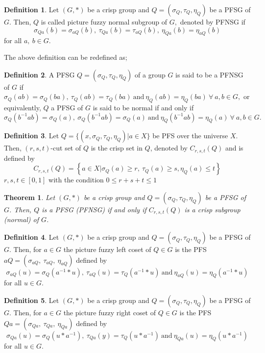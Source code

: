 \documentclass[12pt,letterpaper]{amsart}
\theoremstyle{plain}
\newtheorem{theorem}{Theorem}[section]
\theoremstyle{definition}
\newtheorem{definition}{Definition}[section]
\numberwithin{equation}{section}
\begin{document}
\begin{definition}\cite{dp}
Let $(G, \ast)$ be a crisp group and $Q = (\sigma_{Q}, \tau_Q, \eta_Q)$ be a PFSG of $G$. Then, $Q$ is called picture fuzzy normal subgroup of $G,$ denoted by PFNSG if $$\sigma_{Qa}(b) = \sigma_{aQ}(b),~ \tau_{Qa}(b) = \tau_{aQ}(b),~ \eta_{Qa}(b) = \eta_{aQ}(b)$$ for all $a,~ b \in G$.
\end{definition}
\noindent The above definition can be redefined as;
\begin{definition}
A PFSG $Q = (\sigma_{Q}, \tau_Q, \eta_Q)$ of a group $G$ is said to be a PFNSG of $G$ if $\sigma_Q(ab) = \sigma_Q(ba),~ \tau_Q(ab) = \tau_Q(ba)~ \text{and}~ \eta_Q(ab) = \eta_Q(ba)~\forall~ a, b \in G,$ or equivalently, $Q$ a PFSG of $G$ is said to be normal if and only if $$\sigma_Q(b^{-1}ab) = \sigma_Q(a),~ \sigma_Q(b^{-1}ab) = \sigma_Q(a)~ \text{and}~ \eta_Q(b^{-1}ab) = \eta_Q(a)~ \forall~ a, b \in G.$$
\end{definition}

\begin{definition} \cite{dp}
Let $Q  = \lbrace (x, \sigma_{Q}, \tau_{Q}, \eta_{Q})| a \in X \rbrace$ be PFS over the universe $X$. Then, $(r,s,t)$-cut set of $Q$ is the crisp set in $Q$, denoted by $C_{r, s, t} (Q)$ and is defined by $$C_{r, s, t} (Q) = \left\lbrace a \in X | \sigma_{Q}(a) \geq r,~\tau_{Q}(a) \geq s, \eta_{Q}(a) \leq t  \right\rbrace$$ $r, s, t \in [0, 1]$ with the condition  $0 \leq r + s + t \leq 1$
\end{definition}

\begin{theorem}\cite{dp}\label{1}
Let $(G, \ast)$ be a crisp group and $Q = (\sigma_{Q}, \tau_Q, \eta_Q)$ be a PFSG of $G$. Then, $Q$ is a PFSG (PFNSG) if and only if $C_{r, s, t} (Q)$ is a crisp subgroup (normal) of $G$.
\end{theorem}

\begin{definition} \cite{dp}
Let $(G, \ast)$ be a crisp group and $Q = (\sigma_{Q}, \tau_Q, \eta_Q)$ be a PFSG of $G$. Then, for $a \in G$ the picture fuzzy left coset of $Q \in G$ is the PFS $aQ = (\sigma_{aQ},~ \tau_{aQ},~ \eta_{aQ})$ defined by $$\sigma_{aQ}(u) = \sigma_{Q} (a^{-1} \ast u),~ \tau_{aQ}(u) = \tau_{Q} (a^{-1} \ast u)~ \text{and}~  \eta_{aQ}(u) = \eta_{Q} (a^{-1} \ast u)$$ for all $ u \in G$.
\end{definition}

\begin{definition}\cite{dp}
Let $(G, \ast)$ be a crisp group and $Q = (\sigma_{Q}, \tau_Q, \eta_Q)$ be a PFSG of $G$. Then, for $a \in G$ the picture fuzzy right coset of $Q \in G$ is the PFS $Qa = (\sigma_{Qa},~ \tau_{Qa},~ \eta_{Qa})$ defined by $$\sigma_{Qa}(u) = \sigma_{Q} (u \ast a^{-1}),~ \tau_{Qa}(y) = \tau_{Q} (u \ast a^{-1})~ \text{and}~ \eta_{Qa}(u) = \eta_{Q} ( u \ast a^{-1})$$ for all $u \in G$.
\end{definition}
\end{document}

